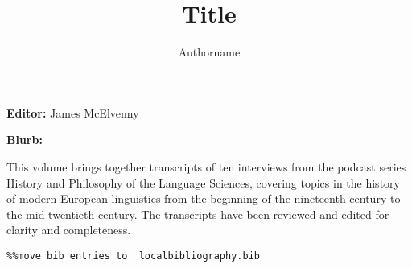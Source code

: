 \documentclass[output=paper]{langscibook}
\author{Authorname\orcid{}\affiliation{}}
\title{Title}
\begin{document}
\maketitle 


\textbf{}

\textbf{Editor:} James McElvenny

\textbf{Blurb:}

This volume brings together transcripts of ten interviews from the podcast series History and Philosophy of the Language Sciences, covering topics in the history of modern European linguistics from the beginning of the nineteenth century to the mid-twentieth century. The transcripts have been reviewed and edited for clarity and completeness.


\begin{verbatim}%%move bib entries to  localbibliography.bib
\end{verbatim}
\sloppy\printbibliography[heading=subbibliography,notkeyword=this]
\end{document}
